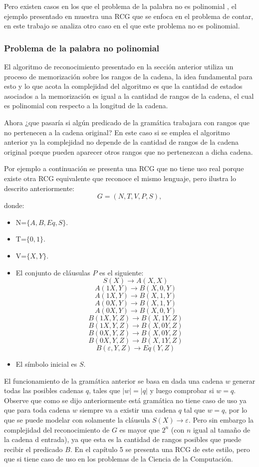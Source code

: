 Pero existen casos en los que el problema de la palabra no
es polinomial \cite{propertiesRCGBib}, el ejemplo presentado en \cite{propertiesRCGBib} muestra una RCG que se enfoca en el problema de contar,
en este trabajo se analiza otro caso en el que este problema no es polinomial.

\subsubsection{Problema de la palabra no polinomial}

El algoritmo de reconocimiento presentado en la sección anterior utiliza un proceso de memorización sobre los rangos
de la cadena, la idea fundamental para esto y lo que acota la complejidad del algoritmo es que la cantidad de estados
asociados a la memorización es igual a la cantidad de rangos de la cadena, el cual es polinomial con respecto a la longitud
de la cadena.

Ahora ¿que pasaría si algún predicado de la gramática trabajara con rangos que no pertenecen a la cadena original?
En este caso si se emplea el algoritmo anterior ya la complejidad no depende de la cantidad de rangos de la cadena original
porque pueden aparecer otros rangos que no pertenezcan a dicha cadena.

Por ejemplo a continuación se presenta una RCG que no tiene uso real porque existe otra RCG equivalente que reconoce el
mismo lenguaje, pero ilustra lo descrito anteriormente:
\[
      G = (N, T, V, P, S),
\]
donde:

\begin{itemize}
      \item  N=$\{A,B,Eq,S\}$.
      \item T=$\{0,1\}$.
      \item V=$\{X,Y\}$.
      \item El conjunto de cláusulas $P$ es el siguiente:
            $$S(X)\to A(X,X)$$
            $$A(1X,Y)\to B(X,0,Y)$$
            $$A(1X,Y)\to B(X,1,Y)$$
            $$A(0X,Y)\to B(X,1,Y)$$
            $$A(0X,Y)\to B(X,0,Y)$$
            $$B(1X,Y,Z)\to B(X,1Y,Z)$$
            $$B(1X,Y,Z)\to B(X,0Y,Z)$$
            $$B(0X,Y,Z)\to B(X,0Y,Z)$$
            $$B(0X,Y,Z)\to B(X,1Y,Z)$$
            $$B(\varepsilon,Y,Z)\to Eq(Y,Z)$$
      \item El símbolo inicial es $S$.
\end{itemize}

El funcionamiento de la gramática anterior se basa en dada una cadena $w$ generar todas las posibles cadenas $q$, tales
que $|w|=|q|$ y luego comprobar si $w = q$. Observe que como se dijo anteriormente está gramática no tiene caso de uso
ya que para toda cadena $w$ siempre va a existir una cadena $q$ tal que $w=q$, por lo que se puede modelar con solamente
la cláusula $S(X)\to \varepsilon$. Pero sin embargo la complejidad del reconocimiento de $G$ es mayor que $2^n$ (con $n$
igual al tamaño de la cadena d entrada), ya que esta es la cantidad de rangos posibles que puede recibir el predicado $B$.
En el capítulo 5 se presenta una RCG de este estilo, pero que si tiene caso de uso en los problemas de la Ciencia de la Computación.

